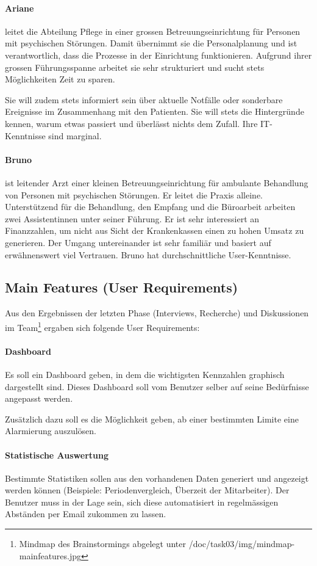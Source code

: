 \documentclass[a4paper]{scrreprt}
\begin{document}
\paragraph{Ariane} leitet die Abteilung Pflege in einer grossen Betreuungseinrichtung für Personen mit psychischen Störungen. Damit übernimmt sie die Personalplanung und ist verantwortlich, dass die Prozesse in der Einrichtung funktionieren. Aufgrund ihrer grossen Führungsspanne arbeitet sie sehr strukturiert und sucht stets Möglichkeiten Zeit zu sparen.

Sie will zudem stets informiert sein über aktuelle Notfälle oder sonderbare Ereignisse im Zusammenhang mit den Patienten. Sie will stets die Hintergründe kennen, warum etwas passiert und überlässt nichts dem Zufall. Ihre IT-Kenntnisse sind marginal.


\paragraph{Bruno} ist leitender Arzt einer kleinen Betreuungseinrichtung für ambulante Behandlung von Personen mit psychischen Störungen. Er leitet die Praxis alleine. Unterstützend für die Behandlung, den Empfang und die Büroarbeit arbeiten zwei Assistentinnen unter seiner Führung. Er ist sehr interessiert an Finanzzahlen, um nicht aus Sicht der Krankenkassen einen zu hohen Umsatz zu generieren. Der Umgang untereinander ist sehr familiär und basiert auf erwähnenswert viel Vertrauen. Bruno hat durchschnittliche User-Kenntnisse.


\subsection{Main Features (User Requirements)}
Aus den Ergebnissen der letzten Phase (Interviews, Recherche) und Diskussionen im Team\footnote{Mindmap des Brainstormings abgelegt unter /doc/task03/img/mindmap-mainfeatures.jpg} ergaben sich folgende User Requirements:

\paragraph{Dashboard}
Es soll ein Dashboard geben, in dem die wichtigsten Kennzahlen graphisch dargestellt sind. Dieses Dashboard soll vom Benutzer selber auf seine Bedürfnisse angepasst werden. 

Zusätzlich dazu soll es die Möglichkeit geben, ab einer bestimmten Limite eine Alarmierung auszulösen. 

\paragraph{Statistische Auswertung}
Bestimmte Statistiken sollen aus den vorhandenen Daten generiert und angezeigt werden können (Beispiele: Periodenvergleich, Überzeit der Mitarbeiter). Der Benutzer muss in der Lage sein, sich diese automatisiert in regelmässigen Abständen per Email zukommen zu lassen.
\end{document}
